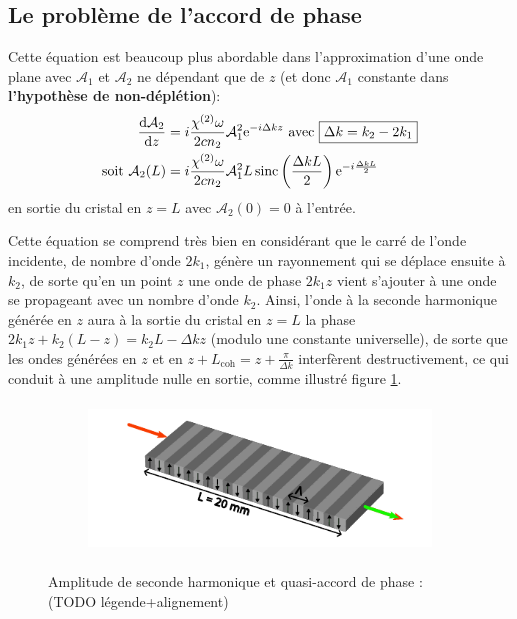 \documentclass[11pt,a4paper] { article}
\newcommand{\A}{\mathcal{A}}
\newcommand{\e}[1]{\text{e}^{#1}}
\newcommand{\mathsc}[1]{\mathrm{\scriptscriptstyle {#1}}}
\begin{document}
\subsection{Le problème de l'accord de phase}

Cette équation est beaucoup plus abordable dans l'approximation d'une onde plane avec $\A_1$ et $\A_2$ ne dépendant que de $z$ (et donc $\A_1$ constante dans \textbf{l'hypothèse de non-déplétion}):
\begin{align}
	\dv{\A_2}{z} &= i\frac{\chi^{(2)}\omega}{2cn_2} \A_1^2 \e{-i \Delta k z} \text{ avec } \boxed{\Delta k = k_2 - 2k_1} \label{eq:pwe} \\
	\text{soit } \A_2(L) &= i \frac{\chi^{(2)}\omega}{2 cn_2} \A_1^2 L \operatorname{sinc}\left( \frac{\Delta k L}{2} \right) \e{-i\frac{\Delta k L}{2}}
\end{align}
en sortie du cristal en $z=L$ avec $\A_2(0)=0$ à l'entrée.

Cette équation se comprend très bien en considérant que le carré de l'onde incidente, de nombre d'onde $2k_1$, génère un rayonnement qui se déplace ensuite à $k_2$, de sorte qu'en un point $z$ une onde de phase $2k_1z$ vient s'ajouter à une onde se propageant avec un nombre d'onde $k_2$. Ainsi, l'onde à la seconde harmonique générée en $z$ aura à la sortie du cristal en $z=L$ la phase $2k_1 z + k_2 (L-z) = k_2 L - \Delta k z$ (modulo une constante universelle), de sorte que les ondes générées en $z$ et en $z+L_\mathsc{coh} =z + \frac{\pi}{\Delta k}$ interfèrent destructivement, ce qui conduit à une amplitude nulle en sortie, comme illustré figure \ref{fig:agen}.

\begin{figure}[htpb] 
\centering
\begin{subfigure}[b]{0.48\textwidth}
	\centering
	\hspace*{-0.8cm}
	
	\vspace*{-1cm}
	\caption{}
	\label{fig:agen}
\end{subfigure}
\begin{subfigure}[b]{0.48\textwidth}
	\includegraphics[height=4cm]{./img/PP.pdf}
	\vspace*{0.8cm}
	\caption{}
	\label{fig:inversion}
\end{subfigure}
\hspace*{-0.6cm}
\caption{Amplitude de seconde harmonique et quasi-accord de phase : \small  (TODO légende+alignement)} %
\label{fig:QPM}
\end{figure}
\end{document}
